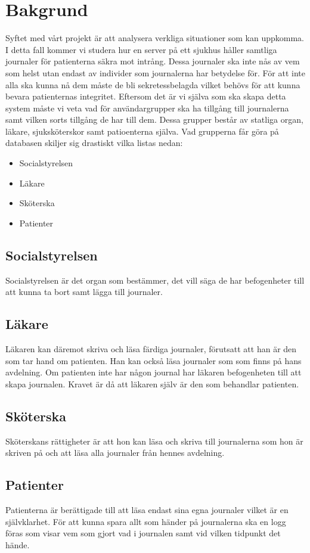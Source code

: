 \section{Bakgrund}

Syftet med vårt projekt är att analysera verkliga situationer som kan uppkomma. I detta fall kommer vi studera hur en server på ett sjukhus håller samtliga journaler för patienterna säkra mot intrång. Dessa journaler ska inte nås av vem som helst utan endast av individer som journalerna har betydelse för. För att inte alla ska kunna nå dem måste de bli sekretessbelagda vilket behövs för att kunna bevara patienternas integritet. Eftersom det är vi själva som ska skapa detta system måste vi veta vad för användargrupper ska ha tillgång till journalerna samt vilken sorts tillgång de har till dem. Dessa grupper består av statliga organ, läkare, sjuksköterskor samt patioenterna själva. Vad grupperna får göra på databasen skiljer sig drastiskt vilka listas nedan:

\begin{itemize}
\item{Socialstyrelsen}
\item{Läkare}
\item{Sköterska}
\item{Patienter}
\end{itemize} 


\subsection{Socialstyrelsen}
Socialstyrelsen är det organ som bestämmer, det vill säga de har befogenheter till att kunna ta bort samt lägga till journaler. 

\subsection{Läkare}
Läkaren kan däremot skriva och läsa färdiga journaler, förutsatt att han är den som tar hand om patienten. Han kan också läsa journaler som som finns på hans avdelning. Om patienten inte har någon journal har läkaren befogenheten till att skapa journalen. Kravet är då att läkaren själv är den som behandlar patienten.

\subsection{Sköterska}
Sköterskans rättigheter är att hon kan läsa och skriva till journalerna som hon är skriven på och att läsa alla journaler från hennes avdelning.

\subsection{Patienter}
Patienterna är berättigade till att läsa endast sina egna journaler vilket är en självklarhet.
För att kunna spara allt som händer på journalerna ska en logg föras som visar vem som gjort vad i journalen samt vid vilken tidpunkt det hände.
